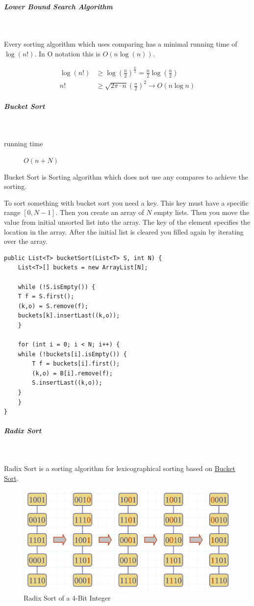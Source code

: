 \documentclass[11pt,twoside,twocolumn,landscape]{article}
\begin{document}
\subparagraph{Lower Bound Search Algorithm} \
\label{sec:orga370fa3}

Every sorting algorithm which uses comparing has a minimal running time of \(\log(n!)\).
In O notation this is \(O(n \log(n))\).

\begin{align}
\log(n!) &\geq \log{(\frac{n}{2})^{\frac{n}{2}}} = \frac{n}{2}\log(\frac{n}{2}) \\
n! &\geq \sqrt{2\pi \cdot n}(\frac{n}{2})^2 \rightarrow O(n \log n)
\end{align}

\subparagraph{Bucket Sort} \
\label{sec:org1dd8cc5}

\begin{description}
\item[{running time}] \(O(n + N)\)
\end{description}

Bucket Sort is Sorting algorithm which does not use any compares to achieve the sorting.

To sort something with bucket sort you need a key.
This key must have a specific range \([0, N-1]\).
Then you create an array of \(N\) empty lists.
Then you move the value from initial unsorted list into the array.
The key of the element specifies the location in the array.
After the initial list is cleared you filled again by iterating over the array.

\lstset{language=java,label= ,caption= ,captionpos=b,numbers=none}
\begin{lstlisting}
public List<T> bucketSort(List<T> S, int N) {
    List<T>[] buckets = new ArrayList[N];

    while (!S.isEmpty()) {
	T f = S.first();
	(k,o) = S.remove(f);
	buckets[k].insertLast((k,o));
    }

    for (int i = 0; i < N; i++) {
	while (!buckets[i].isEmpty()) {
	    T f = buckets[i].first();
	    (k,o) = B[i].remove(f);
	    S.insertLast((k,o));
	}
    }
}

\end{lstlisting}

\subparagraph{Radix Sort} \
\label{sec:org331bb35}

Radix Sort is a sorting algorithm for lexicographical sorting based on \href{../../../roam/20211215102604-bucket_sort.org}{Bucket Sort}.

\begin{figure}[htbp]
\centering
\includegraphics[width=.9\linewidth]{img/radix_sort.png}
\caption{\label{fig:org7ab3efe}Radix Sort of a 4-Bit Integer}
\end{figure}
\end{document}
